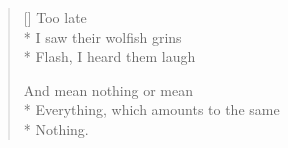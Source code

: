 \label{ch:lear_at}
\settowidth{\versewidth}{Everything, which amounts to the same}
\begin{verse}[\versewidth]
\hspace*{3\vgap} Too late\\*
I saw their wolfish grins\\*
Flash, I heard them laugh

And mean nothing   or mean\\*
Everything, which amounts to the same\\*
Nothing.
\end{verse}
